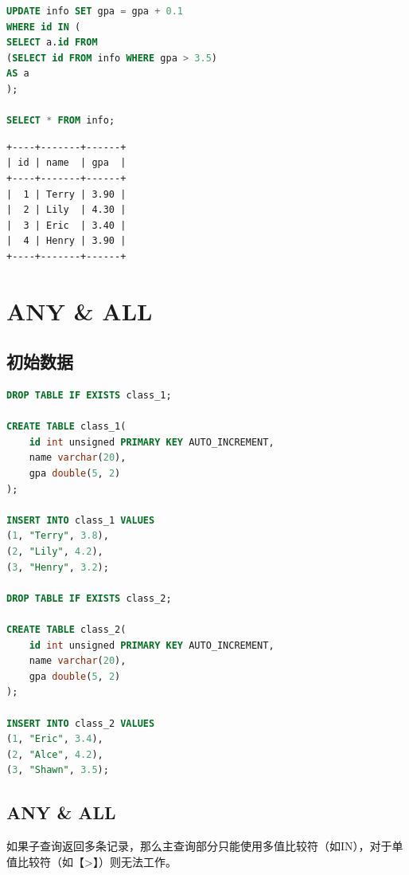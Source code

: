 \documentclass[12pt, openany, oneside]{book}
\begin{document}
\begin{lstlisting}[language=SQL]
UPDATE info SET gpa = gpa + 0.1
WHERE id IN (
SELECT a.id FROM
(SELECT id FROM info WHERE gpa > 3.5)
AS a
);

SELECT * FROM info;
\end{lstlisting}

\begin{tcolorbox}
\begin{verbatim}
+----+-------+------+
| id | name  | gpa  |
+----+-------+------+
|  1 | Terry | 3.90 |
|  2 | Lily  | 4.30 |
|  3 | Eric  | 3.40 |
|  4 | Henry | 3.90 |
+----+-------+------+
	\end{verbatim}
\end{tcolorbox}

\newpage

\chapter{ANY \& ALL}

\section{初始数据}


\begin{lstlisting}[language=SQL]
DROP TABLE IF EXISTS class_1;

CREATE TABLE class_1(
    id int unsigned PRIMARY KEY AUTO_INCREMENT,
    name varchar(20),
    gpa double(5, 2)
);

INSERT INTO class_1 VALUES
(1, "Terry", 3.8),
(2, "Lily", 4.2),
(3, "Henry", 3.2);

DROP TABLE IF EXISTS class_2;

CREATE TABLE class_2(
    id int unsigned PRIMARY KEY AUTO_INCREMENT,
    name varchar(20),
    gpa double(5, 2)
);

INSERT INTO class_2 VALUES
(1, "Eric", 3.4),
(2, "Alce", 4.2),
(3, "Shawn", 3.5);
\end{lstlisting}

\vspace{0.5cm}

\section{ANY \& ALL}

如果子查询返回多条记录，那么主查询部分只能使用多值比较符（如IN），对于单值比较符（如【>】）则无法工作。\\
\end{document}
